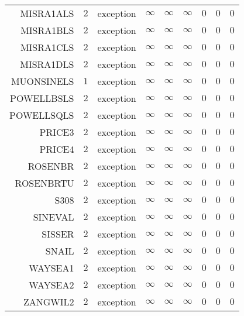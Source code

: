 \begin{longtable}{rrrrrrrrr}
MISRA1ALS & \(     2\) & exception & \(\infty\) & \(\infty\) & \(\infty\) & \(     0\) & \(     0\) & \(     0\) \\
MISRA1BLS & \(     2\) & exception & \(\infty\) & \(\infty\) & \(\infty\) & \(     0\) & \(     0\) & \(     0\) \\
MISRA1CLS & \(     2\) & exception & \(\infty\) & \(\infty\) & \(\infty\) & \(     0\) & \(     0\) & \(     0\) \\
MISRA1DLS & \(     2\) & exception & \(\infty\) & \(\infty\) & \(\infty\) & \(     0\) & \(     0\) & \(     0\) \\
MUONSINELS & \(     1\) & exception & \(\infty\) & \(\infty\) & \(\infty\) & \(     0\) & \(     0\) & \(     0\) \\
POWELLBSLS & \(     2\) & exception & \(\infty\) & \(\infty\) & \(\infty\) & \(     0\) & \(     0\) & \(     0\) \\
POWELLSQLS & \(     2\) & exception & \(\infty\) & \(\infty\) & \(\infty\) & \(     0\) & \(     0\) & \(     0\) \\
PRICE3 & \(     2\) & exception & \(\infty\) & \(\infty\) & \(\infty\) & \(     0\) & \(     0\) & \(     0\) \\
PRICE4 & \(     2\) & exception & \(\infty\) & \(\infty\) & \(\infty\) & \(     0\) & \(     0\) & \(     0\) \\
ROSENBR & \(     2\) & exception & \(\infty\) & \(\infty\) & \(\infty\) & \(     0\) & \(     0\) & \(     0\) \\
ROSENBRTU & \(     2\) & exception & \(\infty\) & \(\infty\) & \(\infty\) & \(     0\) & \(     0\) & \(     0\) \\
S308 & \(     2\) & exception & \(\infty\) & \(\infty\) & \(\infty\) & \(     0\) & \(     0\) & \(     0\) \\
SINEVAL & \(     2\) & exception & \(\infty\) & \(\infty\) & \(\infty\) & \(     0\) & \(     0\) & \(     0\) \\
SISSER & \(     2\) & exception & \(\infty\) & \(\infty\) & \(\infty\) & \(     0\) & \(     0\) & \(     0\) \\
SNAIL & \(     2\) & exception & \(\infty\) & \(\infty\) & \(\infty\) & \(     0\) & \(     0\) & \(     0\) \\
WAYSEA1 & \(     2\) & exception & \(\infty\) & \(\infty\) & \(\infty\) & \(     0\) & \(     0\) & \(     0\) \\
WAYSEA2 & \(     2\) & exception & \(\infty\) & \(\infty\) & \(\infty\) & \(     0\) & \(     0\) & \(     0\) \\
ZANGWIL2 & \(     2\) & exception & \(\infty\) & \(\infty\) & \(\infty\) & \(     0\) & \(     0\) & \(     0\) \\\hline
\end{longtable}
